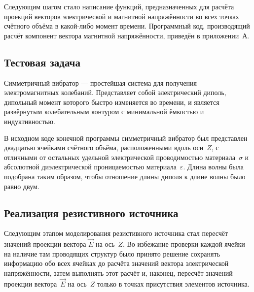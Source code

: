Следующим шагом стало написание функций, предназначенных для расчёта проекций векторов электрической и магнитной напряжённости во всех точках счётного объёма в какой-либо момент времени. Программный код, производящий расчёт компонент вектора магнитной напряжённости, приведён в приложении~А.

\subsection{Тестовая задача}

Симметричный вибратор --- простейшая система для получения электромагнитных колебаний. Представляет собой электрический диполь, дипольный момент которого быстро изменяется во времени, и является развёрнутым колебательным контуром с минимальной ёмкостью и индуктивностью.

В исходном коде конечной программы симметричный вибратор был представлен двадцатью ячейками счётного объёма, расположенными вдоль оси~$ Z $, с отличными от остальных удельной электрической проводимостью материала~$\sigma$
и абсолютной диэлектрической проницаемостью материала~$\varepsilon$. Длина волны была подобрана таким образом, чтобы отношение длины диполя к длине волны было равно двум.

\subsection{Реализация резистивного источника}

Следующим этапом моделирования резистивного источника стал пересчёт
значений проекции вектора $ \vec{E} $ на ось~$ Z $. Во избежание проверки каждой ячейки на наличие там проводящих структур было принято решение сохранять информацию обо всех ячейках до расчёта значений вектора электрической напряжённости, затем выполнять этот расчёт и, наконец, пересчёт значений проекции
вектора~$ \vec{E} $ на ось~$ Z $ только в точках присутствия элементов источника.


